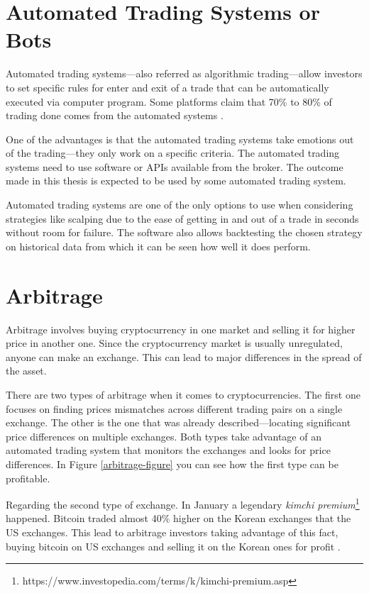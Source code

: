 \section{Automated Trading Systems or Bots}
\label{bots}
Automated trading systems---also referred as algorithmic trading---allow investors to set specific rules for enter and exit of a trade that can be automatically executed via computer program. Some platforms claim that 70\% to 80\% of trading done comes from the automated systems \cite{investopedia-bot-trading}.

One of the advantages is that the automated trading systems take emotions out of the trading---they only work on a specific criteria. The automated trading systems need to use software or APIs available from the broker. The outcome made in this thesis is expected to be used by some automated trading system.

Automated trading systems are one of the only options to use when considering strategies like scalping due to the ease of getting in and out of a trade in seconds without room for failure. The software also allows backtesting the chosen strategy on historical data from which it can be seen how well it does perform.

\section{Arbitrage}
Arbitrage involves buying cryptocurrency in one market and selling it for higher price in another one. Since the cryptocurrency market is usually unregulated, anyone can make an exchange. This can lead to major differences in the spread of the asset.

There are two types of arbitrage when it comes to cryptocurrencies. The first one focuses on finding prices mismatches across different trading pairs on a single exchange. The other is the one that was already described---locating significant price differences on multiple exchanges. Both types take advantage of an automated trading system that monitors the exchanges and looks for price differences. In Figure \ref{arbitrage-figure} you can see how the first type can be profitable.

Regarding the second type of exchange. In January a legendary \emph{kimchi premium}\footnote{https://www.investopedia.com/terms/k/kimchi-premium.asp} happened. Bitcoin traded almost 40\% higher on the Korean exchanges that the US exchanges. This lead to arbitrage investors taking advantage of this fact, buying bitcoin on US exchanges and selling it on the Korean ones for profit \cite{hodlbot:day-trading-cryptocurrency}.

